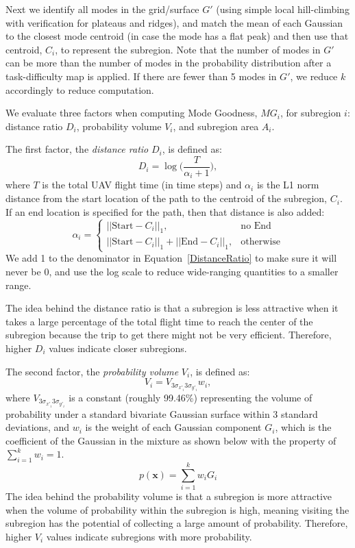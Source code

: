 Next we identify all modes in the grid/surface $G'$ (using simple local hill-climbing with verification for plateaus and ridges), and match the mean of each Gaussian to the closest mode centroid (in case the mode has a flat peak) and then use that centroid, $C_i$, to represent the subregion. Note that the number of modes in $G'$ can be more than the number of modes in the probability distribution after a task-difficulty map is applied. If there are fewer than 5 modes in $G'$, we reduce $k$ accordingly to reduce computation.

We evaluate three factors when computing Mode Goodness, $MG_i$, for subregion $i$: distance ratio $D_i$, probability volume $V_i$, and subregion area $A_i$. 

The first factor, the \textit{distance ratio} $D_i$, is defined as:
\begin{equation}
D_i = \log\Big(\frac{T}{\alpha_i+1}\Big),
\label{DistanceRatio}
\end{equation}
where $T$ is the total UAV flight time (in time steps) and $\alpha_i$ is the L1 norm distance from the start location of the path to the centroid of the subregion, $C_i$. If an end location is specified for the path, then that distance is also added:
\begin{equation}
\alpha_i = 
	\left\{
	\begin{array}{ll}
		||\mbox{Start}-C_i||_1, & \mbox{no End} \\
		||\mbox{Start}-C_i||_1 + ||\mbox{End}-C_i||_1, & \mbox{otherwise}
	\end{array}
	\right.
\label{Alpha}
\end{equation}
We add 1 to the denominator in Equation~\ref{DistanceRatio} to make sure it will never be 0, and use the log scale to reduce wide-ranging quantities to a smaller range. 

The idea behind the distance ratio is that a subregion is less attractive when it takes a large percentage of the total flight time to reach the center of the subregion because the trip to get there might not be very efficient. Therefore, higher $D_i$ values indicate closer subregions.

The second factor, the \textit{probability volume} $V_i$, is defined as:
\begin{equation}
V_i = V_{3\sigma_{x'_i}3\sigma_{y'_i}}w_i,
\label{Volume}
\end{equation}
where $V_{3\sigma_{x'_i}3\sigma_{y'_i}}$ is a constant (roughly 99.46\%) representing the volume of probability under a standard bivariate Gaussian surface within 3 standard deviations, and $w_i$ is the weight of each Gaussian component $G_i$, which is the coefficient of the Gaussian in the mixture as shown below with the property of $\sum_{i=1}^k w_i = 1$.
\begin{equation}
p(\mathbf{x}) = \sum_{i=1}^k w_i G_i
\label{Alphas}
\end{equation}
The idea behind the probability volume is that a subregion is more attractive when the volume of probability within the subregion is high, meaning visiting the subregion has the potential of collecting a large amount of probability. Therefore, higher $V_i$ values indicate subregions with more probability.

